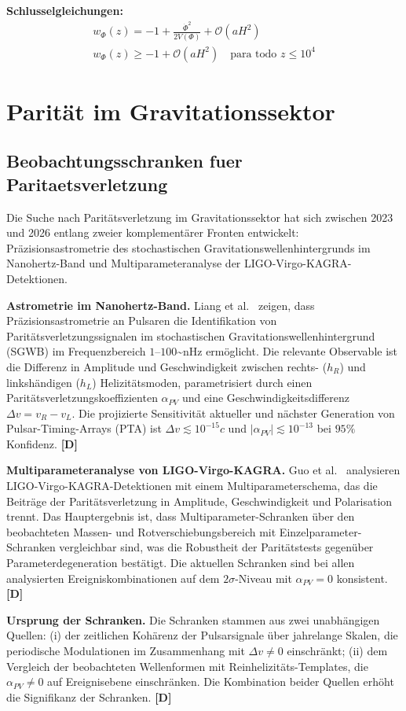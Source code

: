 ﻿\documentclass[11pt,letterpaper]{article}
\begin{document}
\textbf{Schlusselgleichungen:}
\begin{align*}
    w_\Phi(z) = -1 + \frac{\dot\Phi^2}{2V(\Phi)} + \mathcal{O}(aH^2) \\
    w_\Phi(z) \geq -1 + \mathcal{O}(aH^2) \quad \text{para todo } z \leq 10^4
\end{align*}
\section{Parität im Gravitationssektor}
\subsection{Beobachtungsschranken fuer Paritaetsverletzung}
Die Suche nach Paritätsverletzung im Gravitationssektor hat sich zwischen 2023 und 2026 entlang zweier komplementärer Fronten entwickelt: Präzisionsastrometrie des stochastischen Gravitationswellenhintergrunds im Nanohertz-Band und Multiparameteranalyse der LIGO-Virgo-KAGRA-Detektionen.

\textbf{Astrometrie im Nanohertz-Band.} Liang et al.\ \cite{Liang2023} zeigen, dass Präzisionsastrometrie an Pulsaren die Identifikation von Paritätsverletzungssignalen im stochastischen Gravitationswellenhintergrund (SGWB) im Frequenzbereich $1$--$100$\textasciitilde{}nHz ermöglicht. Die relevante Observable ist die Differenz in Amplitude und Geschwindigkeit zwischen rechts- ($h_R$) und linkshändigen ($h_L$) Helizitätsmoden, parametrisiert durch einen Paritätsverletzungskoeffizienten $\alpha_{PV}$ und eine Geschwindigkeitsdifferenz $\Delta v = v_R - v_L$. Die projizierte Sensitivität aktueller und nächster Generation von Pulsar-Timing-Arrays (PTA) ist $\Delta v \lesssim 10^{-15}c$ und $|\alpha_{PV}| \lesssim 10^{-13}$ bei $95\%$ Konfidenz. \textbf{[D]}

\textbf{Multiparameteranalyse von LIGO-Virgo-KAGRA.} Guo et al.\ \cite{Guo2026} analysieren LIGO-Virgo-KAGRA-Detektionen mit einem Multiparameterschema, das die Beiträge der Paritätsverletzung in Amplitude, Geschwindigkeit und Polarisation trennt. Das Hauptergebnis ist, dass Multiparameter-Schranken über den beobachteten Massen- und Rotverschiebungsbereich mit Einzelparameter-Schranken vergleichbar sind, was die Robustheit der Paritätstests gegenüber Parameterdegeneration bestätigt. Die aktuellen Schranken sind bei allen analysierten Ereigniskombinationen auf dem $2\sigma$-Niveau mit $\alpha_{PV} = 0$ konsistent. \textbf{[D]}

\textbf{Ursprung der Schranken.} Die Schranken stammen aus zwei unabhängigen Quellen: (i) der zeitlichen Kohärenz der Pulsarsignale über jahrelange Skalen, die periodische Modulationen im Zusammenhang mit $\Delta v \neq 0$ einschränkt; (ii) dem Vergleich der beobachteten Wellenformen mit Reinhelizitäts-Templates, die $\alpha_{PV} \neq 0$ auf Ereignisebene einschränken. Die Kombination beider Quellen erhöht die Signifikanz der Schranken. \textbf{[D]}
\end{document}
